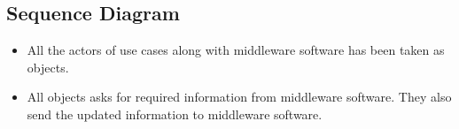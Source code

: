 \documentclass[a4paper,10pt]{report} %
\begin{document}
\subsection {Sequence Diagram}
\begin{itemize}
\item All the actors of use cases along with  middleware software has
been taken as objects.
\item All objects asks for required information from middleware
software. They also send the updated information to middleware software.
\end{itemize}
 
\end{document}
